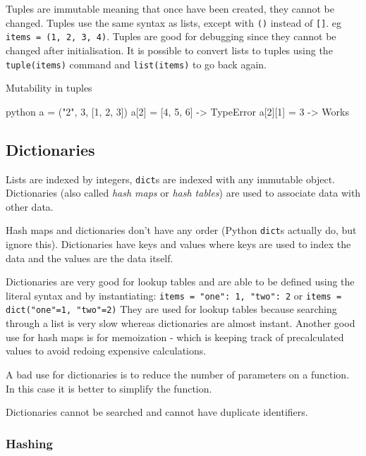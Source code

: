 Tuples are immutable meaning that once have been created, they cannot be changed.
Tuples use the same syntax as lists, except with \texttt{()} instead of \texttt{[]}. eg \texttt{items = (1, 2, 3, 4)}.
Tuples are good for debugging since they cannot be changed after initialisation.
It is possible to convert lists to tuples using the \texttt{tuple(items)} command and \texttt{list(items)} to go back again.

\begin{highlight}{Mutability in tuples}
    \begin{code}{python}
        a = ("2", 3, [1, 2, 3])
        a[2] = [4, 5, 6] -> TypeError
        a[2][1] = 3 -> Works
    \end{code}
\end{highlight}

\subsection{Dictionaries}\label{sub:dictionaries}

Lists are indexed by integers, \texttt{dict}s are indexed with any immutable object.
Dictionaries (also called \emph{hash maps} or \emph{hash tables}) are used to associate data with other data.

Hash maps and dictionaries don't have any order (Python \texttt{dict}s actually do, but ignore this).
Dictionaries have keys and values where keys are used to index the data and the values are the data itself.

Dictionaries are very good for lookup tables and are able to be defined using the literal syntax and by instantiating: \texttt{items = {"one": 1, "two": 2}} or \texttt{items = dict("one"=1, "two"=2)}
They are used for lookup tables because searching through a list is very slow whereas dictionaries are almost instant.
Another good use for hash maps is for memoization - which is keeping track of precalculated values to avoid redoing expensive calculations.

A bad use for dictionaries is to reduce the number of parameters on a function.
In this case it is better to simplify the function.

\begin{note}
    Dictionaries cannot be searched and cannot have duplicate identifiers.
\end{note}

\subsubsection{Hashing}\label{ssub:hashing}

